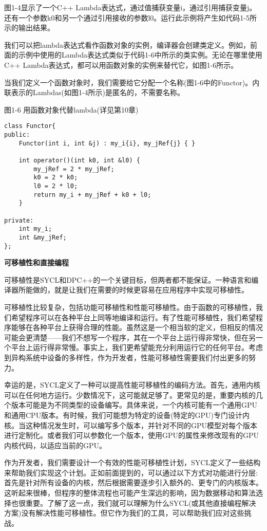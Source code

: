图1-4显示了一个C++ Lambda表达式，通过值捕获变量i，通过引用捕获变量j。还有一个参数k0和另一个通过引用接收的参数l0。运行此示例将产生如代码1-5所示的输出结果。\par

我们可以把lambda表达式看作函数对象的实例，编译器会创建类定义。例如，前面的示例中使用的Lambda表达式类似于代码1-6中所示的类实例。无论在哪里使用C++ Lambda表达式，都可以用函数对象的实例来替代它，如图1-6所示。\par

当我们定义一个函数对象时，我们需要给它分配一个名称(图1-6中的Functor)。内联表示的Lambdas(如图1-4所示)是匿名的，不需要名称。\par

图1-6 用函数对象代替lambda(详见第10章)
\begin{lstlisting}[caption={}]
class Functor{
public:
	Functor(int i, int &j) : my_i{i}, my_jRef{j} { }
	
	int operator()(int k0, int &l0) {
		my_jRef = 2 * my_jRef;
		k0 = 2 * k0;
		l0 = 2 * l0;
		return my_i + my_jRef + k0 + l0;
	}

private:
	int my_i;
	int &my_jRef;
};
\end{lstlisting}

\hspace*{\fill} \par %
\textbf{可移植性和直接编程}

可移植性是SYCL和DPC++的一个关键目标，但两者都不能保证。一种语言和编译器所能做的，就是让我们在需要的时候更容易在应用程序中实现可移植性。\par

可移植性比较复杂，包括功能可移植性和性能可移植性。由于函数的可移植性，我们希望程序可以在各种平台上同等地编译和运行。有了性能可移植性，我们希望程序能够在各种平台上获得合理的性能。虽然这是一个相当软的定义，但相反的情况可能会更清楚——我们不想写一个程序，其在一个平台上运行得非常快，但在另一个平台上运行得非常慢。事实上，我们更希望能充分利用运行它的任何平台。考虑到异构系统中设备的多样性，作为开发者，性能可移植性需要我们付出更多的努力。\par

幸运的是，SYCL定义了一种可以提高性能可移植性的编码方法。首先，通用内核可以在任何地方运行。少数情况下，这可能就足够了。更常见的是，重要内核的几个版本可能是为不同类型的设备编写。具体来说，一个内核可能有一个通用GPU和通用CPU版本。有时候，我们可能想为特定的设备(特定的GPU)专门设计内核。当这种情况发生时，可以编写多个版本，并针对不同的GPU模型对每个版本进行定制化。或者我们可以参数化一个版本，使用GPU的属性来修改现有的GPU内核代码，以适应当前的GPU。\par

作为开发者，我们需要设计一个有效的性能可移植性计划，SYCL定义了一些结构来帮助我们实现这个计划。正如前面提到的，可以通过以下方式对功能进行分层:首先是针对所有设备的内核，然后根据需要逐步引入额外的、更专门的内核版本。这听起来很棒，但程序的整体流程也可能产生深远的影响，因为数据移动和算法选择也很重要。了解了这一点，我们就可以理解为什么SYCL(或其他直接编程解决方案)没有解决性能可移植性。但它作为我们的工具，可以帮助我们应对这些挑战。\par










